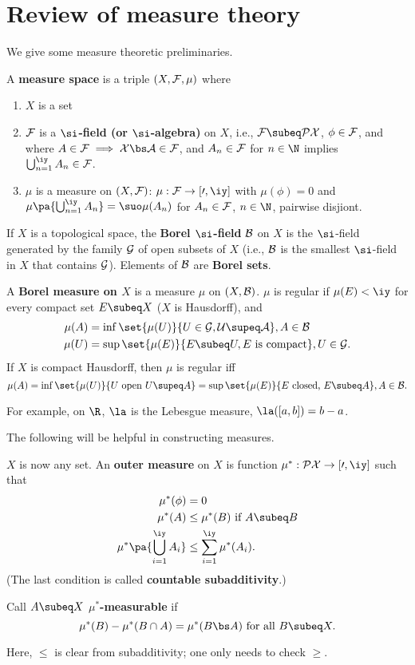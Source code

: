\section{Review of measure theory}
We give some measure theoretic preliminaries. 
\begin{df}
A \textbf{measure space} is a triple $(X,\cal F, \mu)$ where
\begin{enumerate}
\item
$X$ is a set
\item
$\cal F$ is a \textbf{$\si$-field (or $\si$-algebra)} on $X$, i.e., $\cal F\subeq \cal PX$, $\phi\in \cal F$, and where $A\in \cal F\implies X\bs A\in \cal F$, and $A_n\in \cal F$ for $n\in \N$ implies $\bigcup_{n=1}^{\iy}A_n\in \cal F$.
\item
$\mu$ is a measure on $(X,\cal F)$: $\mu:\cal F\to [0,\iy]$ with $\mu(\phi)=0$ and $\mu\pa{\bigcup_{n=1}^{\iy} A_n}=\suo \mu(A_n)$ for $A_n\in \cal F$, $n\in\N$, pairwise disjiont.
\end{enumerate}
\end{df}
\begin{ex}
If $X$ is a topological space, the \textbf{Borel $\si$-field} $\cal B$ on $X$ is the $\si$-field generated by the family $\cal G$ of open subsets of $X$ (i.e., $\cal B$ is the smallest $\si$-field in $X$ that contains $\cal G$). Elements of $\cal B$ are \textbf{Borel sets}.

A \textbf{Borel measure on $X$} is a measure $\mu$ on $(X,\cal B)$. $\mu$ is regular if $\mu(E)<\iy$ for every compact set $E\subeq X$ ($X$ is Hausdorff), and
\begin{align*}
\mu(A)&=\inf \set{\mu(U)}{U\in \cal G,U\supeq A},A\in \cal B\\
\mu(U)&=\sup \set{\mu(E)}{E\subeq U,E\text{ is compact}},U\in \cal G.
\end{align*}
If $X$ is compact Hausdorff, then $\mu$ is regular iff \[\mu(A)=\inf\set{\mu(U)}{U\text{ open }U\supeq A}=\sup\set{\mu(E)}{E\text{ closed, }E\subeq A}, A\in \cal B.\]

For example, on $\R$, $\la$ is the Lebesgue measure, $\la([a,b])=b-a$.
\end{ex}
The following will be helpful in constructing measures.
\begin{df}
$X$ is now any set. An \textbf{outer measure} on $X$ is  function $\mu^*:\cal PX\to [0,\iy]$ such that
\begin{align*}
\mu^*(\phi)&=0\\
\mu^*(A)&\le \mu^*(B)\text{ if }A\subeq B\\
\mu^*\pa{\bigcup_{i=1}^{\iy} A_i}&\le \sum_{i=1}^{\iy} \mu^*(A_i).
\end{align*}
(The last condition is called \textbf{countable subadditivity}.)

Call $A\subeq X$ \textbf{$\mu^*$-measurable} if \[\mu^*(B)-\mu^*(B\cap A)=\mu^*(B\bs A)\text{ for all }B\subeq X.\] 
\end{df}
Here, $\le$ is clear from subadditivity; one only needs to check $\ge$. 

